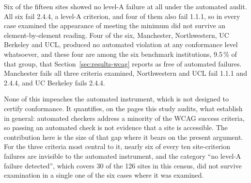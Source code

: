 \documentclass[]{interact}
\begin{document}
Six of the fifteen sites showed no level-A failure at all under the automated audit. All six fail 2.4.4, a level-A criterion, and four of them also fail 1.1.1, so in every case examined the appearance of meeting the minimum did not survive an element-by-element reading. Four of the six, Manchester, Northwestern, UC Berkeley and UCL, produced no automated violation at any conformance level whatsoever, and these four are among the six benchmark institutions, 9.5\,\% of that group, that Section~\ref{sec:results-wcag} reports as free of automated failures. Manchester fails all three criteria examined, Northwestern and UCL fail 1.1.1 and 2.4.4, and UC Berkeley fails 2.4.4.

None of this impeaches the automated instrument, which is not designed to certify conformance. It quantifies, on the pages this study audits, what \citet{fischer2025coverage} establish in general: automated checkers address a minority of the WCAG success criteria, so passing an automated check is not evidence that a site is accessible. The contribution here is the size of that gap where it bears on the present argument. For the three criteria most central to it, nearly six of every ten site-criterion failures are invisible to the automated instrument, and the category ``no level-A failure detected'', which covers 30 of the 126 sites in this census, did not survive examination in a single one of the six cases where it was examined.
\end{document}
